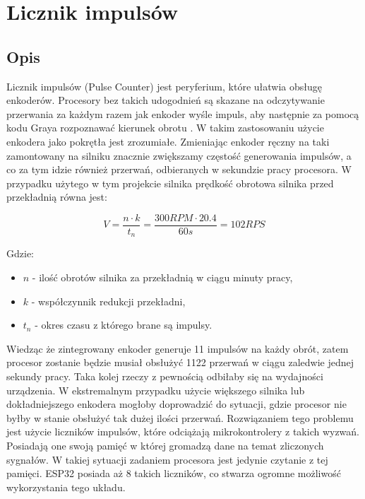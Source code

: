    \section{Licznik impulsów}
        \subsection{Opis}
            Licznik impulsów (Pulse Counter) jest peryferium, które ułatwia obsługę enkoderów. Procesory bez takich udogodnień są skazane na odczytywanie przerwania za każdym razem jak enkoder wyśle impuls, aby następnie za pomocą kodu Graya rozpoznawać kierunek obrotu \cite{gray}. W takim zastosowaniu użycie enkodera jako pokrętła jest zrozumiałe. Zmieniając enkoder ręczny na taki zamontowany na silniku znacznie zwiększamy częstość generowania impulsów, a co za tym idzie również przerwań, odbieranych w sekundzie pracy procesora. W przypadku użytego w tym projekcie silnika prędkość obrotowa silnika przed przekładnią równa jest:
            
            \begin{displaymath}
              V = \frac{ n \cdot k}{t_{n}} = \frac{ 300 RPM \cdot 20.4 }{60s} = 102 RPS
            \end{displaymath}
            
            Gdzie:
            \begin{itemize}
                \item $n$ - ilość obrotów silnika za przekładnią w ciągu minuty pracy,
                \item $k$ - współczynnik redukcji przekładni,
                \item $t_{n}$ - okres czasu z którego brane są impulsy.
            \end{itemize}
            
            Wiedząc że zintegrowany enkoder generuje 11 impulsów na każdy obrót, zatem procesor zostanie będzie musiał obsłużyć 1122 przerwań w ciągu zaledwie jednej sekundy pracy. Taka kolej rzeczy z pewnością odbiłaby się na wydajności urządzenia. W ekstremalnym przypadku użycie większego silnika lub dokładniejszego enkodera mogłoby doprowadzić do sytuacji, gdzie procesor nie byłby w stanie obsłużyć tak dużej ilości przerwań. Rozwiązaniem tego problemu jest użycie liczników impulsów, które odciążają mikrokontrolery z takich wyzwań. Posiadają one swoją pamięć w której gromadzą dane na temat zliczonych sygnałów. W takiej sytuacji zadaniem procesora jest jedynie czytanie z tej pamięci. ESP32 posiada aż 8 takich liczników, co stwarza ogromne możliwość wykorzystania tego układu.
            
